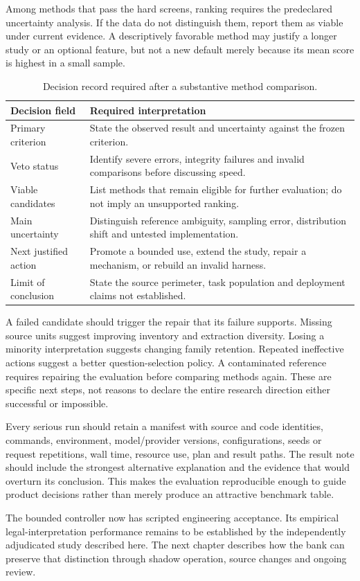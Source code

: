 Among methods that pass the hard screens, ranking requires the predeclared
uncertainty analysis. If the data do not distinguish them, report them as viable
under current evidence. A descriptively favorable method may justify a longer
study or an optional feature, but not a new default merely because its mean score
is highest in a small sample.

\begin{table}[htbp]
\centering\small
\caption{Decision record required after a substantive method comparison.}
\begin{tabularx}{\textwidth}{P{39mm}Y}
\toprule
Decision field & Required interpretation\\\midrule
Primary criterion & State the observed result and uncertainty against the frozen criterion.\\
Veto status & Identify severe errors, integrity failures and invalid comparisons before discussing speed.\\
Viable candidates & List methods that remain eligible for further evaluation; do not imply an unsupported ranking.\\
Main uncertainty & Distinguish reference ambiguity, sampling error, distribution shift and untested implementation.\\
Next justified action & Promote a bounded use, extend the study, repair a mechanism, or rebuild an invalid harness.\\
Limit of conclusion & State the source perimeter, task population and deployment claims not established.\\
\bottomrule
\end{tabularx}
\end{table}


A failed candidate should trigger the repair that its failure supports. Missing
source units suggest improving inventory and extraction diversity. Losing a
minority interpretation suggests changing family retention. Repeated ineffective
actions suggest a better question-selection policy. A contaminated reference
requires repairing the evaluation before comparing methods again. These are
specific next steps, not reasons to declare the entire research direction either
successful or impossible.

Every serious run should retain a manifest with source and code identities,
commands, environment, model/provider versions, configurations, seeds or request
repetitions, wall time, resource use, plan and result paths. The result note should
include the strongest alternative explanation and the evidence that would overturn
its conclusion. This makes the evaluation reproducible enough to guide product
decisions rather than merely produce an attractive benchmark table.

The bounded controller now has scripted engineering acceptance. Its
empirical legal-interpretation performance remains to be established by
the independently adjudicated study described here. The next chapter describes how the bank
can preserve that distinction through shadow operation, source changes and
ongoing review.

